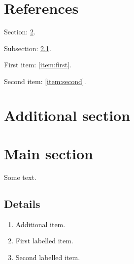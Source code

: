 \documentclass{article}
\begin{document}
\section*{References}

Section: \ref{sec:main}.

Subsection: \ref{subsec:details}.

First item: \ref{item:first}.

Second item: \ref{item:second}.

\section{Additional section}

\section{Main section}
\label{sec:main}

Some text.

\subsection{Details}
\label{subsec:details}

\begin{enumerate}
    \item Additional item.

    \item First labelled item.
    \label{item:first}

    \item Second labelled item.
    \label{item:second}
\end{enumerate}
\end{document}
